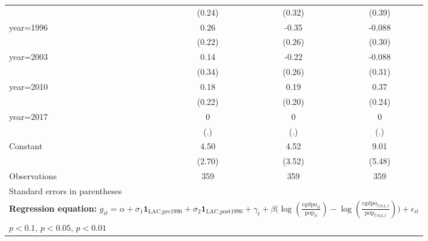 \begin{sidewaystable}[htbp]
\begin{tabular}{l*{3}{c}}
                &   (0.24)         &   (0.32)         &   (0.39)         \\
\addlinespace
year=1996       &     0.26         &    -0.35         &   -0.088         \\
                &   (0.22)         &   (0.26)         &   (0.30)         \\
\addlinespace
year=2003       &     0.14         &    -0.22         &   -0.088         \\
                &   (0.34)         &   (0.26)         &   (0.31)         \\
\addlinespace
year=2010       &     0.18         &     0.19         &     0.37         \\
                &   (0.22)         &   (0.20)         &   (0.24)         \\
\addlinespace
year=2017       &        0         &        0         &        0         \\
                &      (.)         &      (.)         &      (.)         \\
\addlinespace
Constant        &     4.50         &     4.52         &     9.01         \\
                &   (2.70)         &   (3.52)         &   (5.48)         \\
\midrule
Observations    &      359         &      359         &      359         \\
\bottomrule
\multicolumn{4}{l}{\footnotesize Standard errors in parentheses}\\
\multicolumn{4}{l}{\footnotesize \textbf{Regression equation:} \(g_{it} = \alpha + \sigma_1 \mathbf{1}_{\textrm{LAC,pre1990}} + \sigma_2 \mathbf{1}_{\textrm{LAC,post1990}} + \gamma_t + \beta \big(\log (\frac{\textrm{cgdpo}_{it}}{\textrm{pop}_{it}} ) - \log (\frac{\textrm{cgdpo}_{USA,t}}{\textrm{pop}_{USA,t}}  ) \big) + \epsilon_{it}\)}\\
\multicolumn{4}{l}{\footnotesize \sym{*} \(p<0.1\), \sym{**} \(p<0.05\), \sym{***} \(p<0.01\)}\\
\end{tabular}
\end{sidewaystable}
